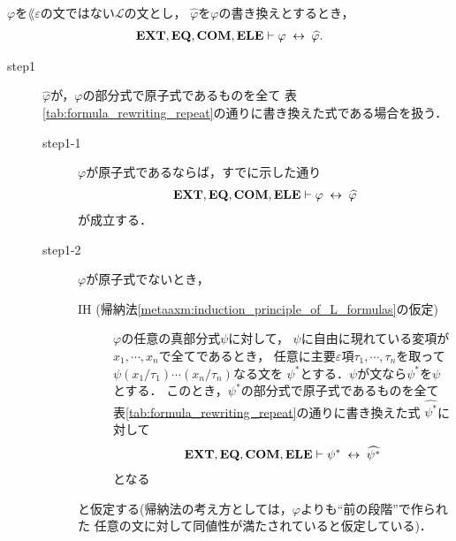 	\begin{screen}
		\begin{thm}[書き換えの同値性]
		\label{thm:equivalence_of_formula_rewritings}
			$\varphi$を$\lang{\varepsilon}$の文ではない$\mathcal{L}$の文とし，
			$\widehat{\varphi}$を$\varphi$の書き換えとするとき，
			\begin{align}
				\mbox{{\bf EXT}},\mbox{{\bf EQ}},\mbox{\bf COM},\mbox{{\bf ELE}} \vdash \varphi \hspace{0.25em}\leftrightarrow\hspace{0.25em} \widehat{\varphi}.
			\end{align}
		\end{thm}
	\end{screen}
	
	\begin{sketch}\mbox{}
		\begin{description}
			\item[step1] $\widehat{\varphi}$が，$\varphi$の部分式で原子式であるものを全て
				表\ref{tab:formula_rewriting_repeat}の通りに書き換えた式である場合を扱う．
				\begin{description}
					\item[step1-1] $\varphi$が原子式であるならば，すでに示した通り
						\begin{align}
							\mbox{{\bf EXT}},\mbox{{\bf EQ}},\mbox{\bf COM},\mbox{{\bf ELE}} \vdash \varphi \hspace{0.25em}\leftrightarrow\hspace{0.25em} \widehat{\varphi}
						\end{align}
						が成立する．
							
					\item[step1-2] $\varphi$が原子式でないとき，
						\begin{description}
							\item[IH (帰納法\ref{metaaxm:induction_principle_of_L_formulas}の仮定)]
								$\varphi$の任意の真部分式$\psi$に対して，
								$\psi$に自由に現れている変項が$x_{1},\cdots,x_{n}$で全てであるとき，
								任意に主要$\varepsilon$項$\tau_{1},\cdots,\tau_{n}$を取って
								$\psi(x_{1}/\tau_{1})\cdots(x_{n}/\tau_{n})$なる文を
								$\psi^{*}$とする．$\psi$が文なら$\psi^{*}$を$\psi$とする．
								このとき，$\psi^{*}$の部分式で原子式であるものを全て
								表\ref{tab:formula_rewriting_repeat}の通りに書き換えた式\footnotemark
								$\widehat{\psi^{*}}$に対して
								\begin{align}
									\mbox{{\bf EXT}},\mbox{{\bf EQ}},\mbox{\bf COM},\mbox{{\bf ELE}} \vdash \psi^{*} \hspace{0.25em}\leftrightarrow\hspace{0.25em} \widehat{\psi^{*}}
								\end{align}
								となる
						\end{description}
						と仮定する(帰納法の考え方としては，$\varphi$よりも``前の段階''で作られた
						任意の文に対して同値性が満たされていると仮定している)．
						

\end{description}
\end{description}
\end{sketch}
